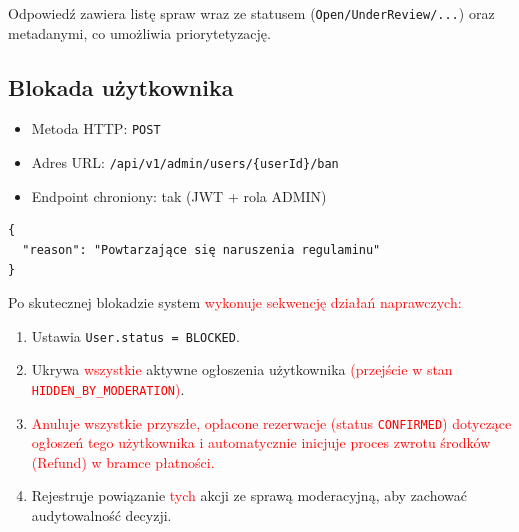\documentclass[11pt, a4paper]{article}
\begin{document}
\noindent Odpowiedź zawiera listę spraw wraz ze statusem (\texttt{Open/UnderReview/...}) oraz metadanymi, co umożliwia priorytetyzację.

\subsection{Blokada użytkownika}
\begin{itemize}
    \item Metoda HTTP: \texttt{POST}
    \item Adres URL: \texttt{/api/v1/admin/users/\{userId\}/ban}
    \item Endpoint chroniony: tak (JWT + rola ADMIN)
\end{itemize}

\begin{lstlisting}[style=json,caption={Ciało żądania — blokada użytkownika}]
{
  "reason": "Powtarzające się naruszenia regulaminu"
}
\end{lstlisting}

\noindent Po skutecznej blokadzie system \textcolor{red}{wykonuje sekwencję działań naprawczych:}
\begin{enumerate}
    \item Ustawia \texttt{User.status = BLOCKED}.
    \item Ukrywa \textcolor{red}{wszystkie} aktywne ogłoszenia użytkownika \textcolor{red}{(przejście w stan \texttt{HIDDEN\_BY\_MODERATION})}.
    \item \textcolor{red}{Anuluje wszystkie przyszłe, opłacone rezerwacje (status \texttt{CONFIRMED}) dotyczące ogłoszeń tego użytkownika i automatycznie inicjuje proces zwrotu środków (Refund) w bramce płatności.}
    \item Rejestruje powiązanie \textcolor{red}{tych} akcji ze sprawą moderacyjną, aby zachować audytowalność decyzji.
\end{enumerate}
\end{document}
